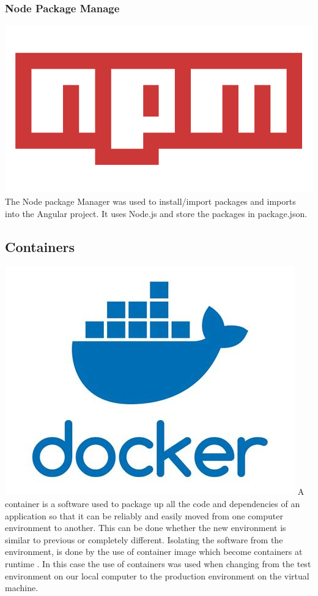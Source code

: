 \subsubsection{Node Package Manage}
\includegraphics[scale=0.05]{./img/NPM.PNG}
The Node package Manager was used to install/import packages and imports into the Angular project. It uses Node.js and store the packages in package.json.

\subsection{Containers}
\includegraphics[scale=0.155]{./img/Docker.jpg}
A container is a software used to package up all the code and dependencies of an application so that it can be reliably and easily moved from one computer environment to another.  This can be done whether the new environment is similar to previous or completely different.  Isolating the software from the environment, is done by the use of container image which become containers at runtime \cite{container}. In this case the use of containers was used when changing from the test environment on our local computer to the production environment on the virtual machine.

